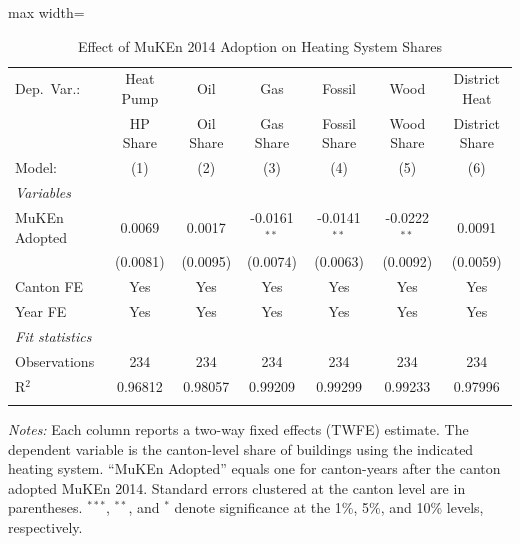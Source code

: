 \begin{table}[htbp]
   \caption{\label{tab:main} Effect of MuKEn 2014 Adoption on Heating System Shares}
   \centering
   \begin{adjustbox}{max width=\textwidth}
   \begin{tabular}{lcccccc}
      \tabularnewline \midrule \midrule
      Dep.\ Var.:   & Heat Pump & Oil       & Gas            & Fossil         & Wood           & District Heat\\  
                    & HP Share  & Oil Share & Gas Share      & Fossil Share   & Wood Share     & District Share \\   
      Model:        & (1)       & (2)       & (3)            & (4)            & (5)            & (6)\\  
      \midrule
      \emph{Variables}\\
      MuKEn Adopted & 0.0069    & 0.0017    & -0.0161$^{**}$ & -0.0141$^{**}$ & -0.0222$^{**}$ & 0.0091\\   
                    & (0.0081)  & (0.0095)  & (0.0074)       & (0.0063)       & (0.0092)       & (0.0059)\\   
      \midrule 
      Canton FE     & Yes       & Yes       & Yes            & Yes            & Yes            & Yes\\  
      Year FE       & Yes       & Yes       & Yes            & Yes            & Yes            & Yes\\  
      \midrule
      \emph{Fit statistics}\\
      Observations  & 234       & 234       & 234            & 234            & 234            & 234\\  
      R$^2$         & 0.96812   & 0.98057   & 0.99209        & 0.99299        & 0.99233        & 0.97996\\  
      \midrule \midrule & \tabularnewline
   \end{tabular}
   \end{adjustbox}
\begin{minipage}{0.92\textwidth}
\vspace{6pt}
\footnotesize
\textit{Notes:} Each column reports a two-way fixed effects (TWFE) estimate. The dependent variable is the canton-level share of buildings using the indicated heating system. ``MuKEn Adopted'' equals one for canton-years after the canton adopted MuKEn 2014. Standard errors clustered at the canton level are in parentheses. $^{***}$, $^{**}$, and $^{*}$ denote significance at the 1\%, 5\%, and 10\% levels, respectively.
\end{minipage}
\end{table}
